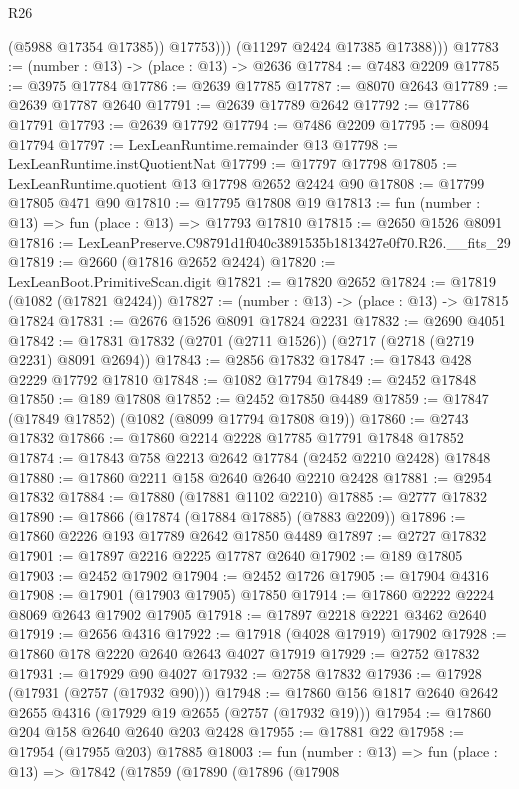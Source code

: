 \begin{lexlean}{R26}
\begin{coremodule}
                (@5988 @17354 @17385))
              @17753)))
        (@11297 @2424 @17385 @17388)))
@17783 := (number : @13) -> (place : @13) -> @2636
@17784 := @7483 @2209
@17785 := @3975 @17784
@17786 := @2639 @17785
@17787 := @8070 @2643
@17789 := @2639 @17787 @2640
@17791 := @2639 @17789 @2642
@17792 := @17786 @17791
@17793 := @2639 @17792
@17794 := @7486 @2209
@17795 := @8094 @17794
@17797 := LexLeanRuntime.remainder @13
@17798 := LexLeanRuntime.instQuotientNat
@17799 := @17797 @17798
@17805 := LexLeanRuntime.quotient @13 @17798 @2652 @2424 @90
@17808 := @17799 @17805 @471 @90
@17810 := @17795 @17808 @19
@17813 := fun (number : @13) => fun (place : @13) => @17793 @17810
@17815 := @2650 @1526 @8091
@17816 := LexLeanPreserve.C98791d1f040c3891535b1813427e0f70.R26.__fits_29
@17819 := @2660 (@17816 @2652 @2424)
@17820 := LexLeanBoot.PrimitiveScan.digit
@17821 := @17820 @2652
@17824 := @17819 (@1082 (@17821 @2424))
@17827 := (number : @13) -> (place : @13) -> @17815 @17824
@17831 := @2676 @1526 @8091 @17824 @2231
@17832 := @2690 @4051
@17842 := @17831 @17832 (@2701 (@2711 @1526)) (@2717 (@2718 (@2719 @2231) @8091 @2694))
@17843 := @2856 @17832
@17847 := @17843 @428 @2229 @17792 @17810
@17848 := @1082 @17794
@17849 := @2452 @17848
@17850 := @189 @17808
@17852 := @2452 @17850 @4489
@17859 := @17847 (@17849 @17852) (@1082 (@8099 @17794 @17808 @19))
@17860 := @2743 @17832
@17866 := @17860 @2214 @2228 @17785 @17791 @17848 @17852
@17874 := @17843 @758 @2213 @2642 @17784 (@2452 @2210 @2428) @17848
@17880 := @17860 @2211 @158 @2640 @2640 @2210 @2428
@17881 := @2954 @17832
@17884 := @17880 (@17881 @1102 @2210)
@17885 := @2777 @17832
@17890 := @17866 (@17874 (@17884 @17885) (@7883 @2209))
@17896 := @17860 @2226 @193 @17789 @2642 @17850 @4489
@17897 := @2727 @17832
@17901 := @17897 @2216 @2225 @17787 @2640
@17902 := @189 @17805
@17903 := @2452 @17902
@17904 := @2452 @1726
@17905 := @17904 @4316
@17908 := @17901 (@17903 @17905) @17850
@17914 := @17860 @2222 @2224 @8069 @2643 @17902 @17905
@17918 := @17897 @2218 @2221 @3462 @2640
@17919 := @2656 @4316
@17922 := @17918 (@4028 @17919) @17902
@17928 := @17860 @178 @2220 @2640 @2643 @4027 @17919
@17929 := @2752 @17832
@17931 := @17929 @90 @4027
@17932 := @2758 @17832
@17936 := @17928 (@17931 (@2757 (@17932 @90)))
@17948 := @17860 @156 @1817 @2640 @2642 @2655 @4316 (@17929 @19 @2655 (@2757 (@17932 @19)))
@17954 := @17860 @204 @158 @2640 @2640 @203 @2428
@17955 := @17881 @22
@17958 := @17954 (@17955 @203) @17885
@18003 := fun (number : @13) =>
  fun (place : @13) =>
  @17842
    (@17859
      (@17890
        (@17896
          (@17908

\end{coremodule}
\end{lexlean}
